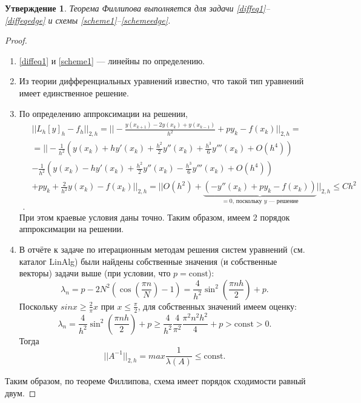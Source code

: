 \documentclass[14pt,a4paper]{extarticle}
\newtheorem{proposition}{Утверждение} %
\newcommand{\1}{\mathbbm{1}}
\begin{document}
\begin{proposition}
    Теорема Филлипова выполняется для задачи \eqref{diffeq1}--\eqref{diffeqedge} и схемы \eqref{scheme1}--\eqref{schemeedge}.
\end{proposition}
\begin{proof}
    \begin{enumerate}
        \item  \eqref{diffeq1} и \eqref{scheme1} --- линейны по определению.
        \item Из теории дифференциальных уравнений известно, что такой тип уравнений имеет единственное решение.
        \item По определению аппроксимации на решении,
        \begin{align*}
            & || L_h [y]_h - f_h || _{2, h} = || -\frac{y(x_{k+1}) - 2 y(x_k) + y(x_{k-1})}{h^2} + p y_k - f(x_k) || _{2, h} = \\ 
            & =|| -\frac{1}{h^2}\left(y(x_{k}) + h y'(x_{k}) + \frac{h^2}{2} y''(x_{k}) + \frac{h^3}{6} y'''(x_{k}) + O(h^4)\right)  \\
            & -\frac{1}{h^2}\left(y(x_{k}) - h y'(x_{k}) + \frac{h^2}{2} y''(x_{k}) - \frac{h^3}{6} y'''(x_{k}) + O(h^4)\right) \\ 
            & + p y_k + \frac{2}{h^2} y(x_k) - f(x_k) || _{2, h} = || O(h^2) + \underbrace{(- y''(x_{k}) + p y_k - f(x_k))}_{=0 \text{, поскольку $y$ --- решение}} ||_{2, h} \leq C h^2 \\ .           
        \end{align*}
        При этом краевые условия даны точно. Таким образом, имеем 2 порядок аппроксимации на решении.
        \item В отчёте к задаче по итерационным методам решения систем уравнений (см. каталог LinAlg) были найдены собственные значения 
        (и собственные векторы) задачи выше (при условии, что $p = \text{const}$): 
        \begin{equation*}
            \lambda_n = p - 2 N^2 (\cos(\frac{\pi n}{N}) - 1) = \frac{4}{h^2} \sin^2(\frac{\pi n h}{2}) + p.
        \end{equation*}
        Поскольку $sin x \geq \frac{2}{\pi} x $ при $x \leq \frac{\pi}{2}$, для собственных значений имеем оценку:
        \begin{equation*}
            \lambda_n = \frac{4}{h^2} \sin^2(\frac{\pi n h}{2}) + p \geq \frac{4}{h^2} \frac{4}{\pi ^2} \frac{\pi ^2 n^2 h^2}{4} + p > \text{const} > 0.
        \end{equation*}
        Тогда
        \begin{equation*}
            || A^{-1} ||_{2,h} = max \frac{1}{\lambda(A)} \leq \text{const}.
        \end{equation*}
    \end{enumerate}
    Таким образом, по теореме Филлипова, схема имеет порядок сходимости равный двум.
\end{proof}
\end{document}
